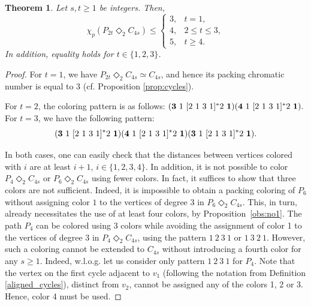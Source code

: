 \documentclass{article}
\newtheorem{theorem}{Theorem}
\begin{document}
\begin{theorem}
    Let $s,t\geq 1$ be integers. Then,
$$\chi_p(P_{2t}\Diamond_2 C_{4s})\leq \left\{
\begin{array}{ll}
3, & t=1,\\
4, & 2 \leq t \leq 3,\\
5, & t\geq 4.
\end{array}\right.
$$
In addition, equality holds for $t\in \{1,2,3\}$. 
\label{thm:l=2C4s}   
\end{theorem}
\begin{proof}
For $t=1$, we have $P_{2t} \Diamond_2 C_{4s} \simeq C_{4s}$, and hence its packing chromatic number is equal to 3 (cf. Proposition \ref{prop:cycles}). 

\noindent For $t=2$, the coloring pattern is as follows: $({\bf 3}\ 1\ [2\ 1\ 3\ 1]^*2\ {\bf 1})({\bf 4}\ 1\ [2\ 1\ 3\ 1]^* 2\ {\bf 1}).$ 
\noindent For $t=3$, we have the following pattern: $$({\bf 3}\ 1\ [2\ 1\ 3\ 1]^*2\ {\bf 1})({\bf 4}\ 1\ [2\ 1\ 3\ 1]^* 2\ {\bf 1})({\bf 3}\ 1\ [2\ 1\ 3\ 1]^*2\ {\bf 1}).$$

\noindent In both cases, one can easily check that the distances between vertices colored with $i$ are at least $i+1$, $i\in \{1,2,3,4\}$. In addition, it is not possible to color $P_4 \Diamond_2 C_{4s}$ or $P_6 \Diamond_2 C_{4s}$ using fewer colors. In fact, it suffices to show that three colors are not sufficient. Indeed, it is impossible to obtain a packing coloring of $P_6$ without assigning color $1$ to the vertices of degree 3 in $P_6 \Diamond_2 C_{4s}$. This, in turn, already necessitates the use of at least four colors, by Proposition~\ref{obs:no1}. The path $P_4$ can be colored  using 3 colors while avoiding the assignment of color 1 to the vertices of degree 3 in $P_4 \Diamond_2 C_{4s}$, using the pattern $1\ 2\ 3\ 1$ or $1\ 3\ 2\ 1$. However, such a coloring cannot be extended to $C_{4s}$ without introducing a fourth color for any $s\geq 1$. Indeed, w.l.o.g. let us consider only pattern $1\ 2\ 3\ 1$ for $P_4$. Note that the vertex on the first cycle adjacent to $v_1$ (following the notation from Definition \ref{aligned_cycles}), distinct from $v_2$, cannot be assigned any of the colors 1, 2 or 3. Hence, color 4 must be used.


\end{proof}
\end{document}
